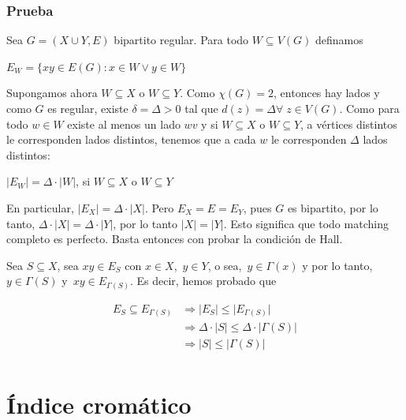 \documentclass[10pt,a4paper]{article}
\begin{document}
\subsubsection*{Prueba}

Sea $G = (X \cup Y, E)$ bipartito regular. Para todo $W \subseteq V(G)$ definamos

\begin{center}
$E_W=\{xy \in E(G): x \in W \lor y \in W\}$
\end{center}

Supongamos ahora $W \subseteq X$ o $W \subseteq Y$. Como $\chi(G) = 2$, entonces hay lados y como $G$ es regular, existe $\delta = \Delta > 0$ tal que $d(z) = \Delta \forall \;z \in V(G)$. Como para todo $w \in W$ existe al menos un lado $wv$ y si $W \subseteq X$ o $W \subseteq Y$, a vértices distintos le corresponden lados distintos, tenemos que a cada $w$ le corresponden $\Delta$ lados distintos:

\begin{center}
$\lvert E_W \rvert = \Delta \cdot \lvert W\rvert$, si $W \subseteq X $ o $W \subseteq Y$
\end{center}

En particular, $\lvert E_X \rvert = \Delta \cdot \lvert X\rvert$. Pero $E_X = E = E_Y$, pues $G$ es bipartito, por lo tanto, $\Delta \cdot \lvert X \rvert = \Delta \cdot \lvert Y \rvert$, por lo tanto $\lvert X \rvert = \lvert Y \rvert$. Esto significa que todo matching completo es perfecto. Basta entonces con probar la condición de Hall.

Sea $S \subseteq X$, sea $xy \in E_S$ con $x \in X$, $y \in Y$, o sea, $y \in \Gamma(x)$ y por lo tanto, $y \in \Gamma(S)$ y $xy \in E_{\Gamma(S)}$. Es decir, hemos probado que

\begin{center}
\begin{align*} E_S \subseteq E_{\Gamma(S)} &\Rightarrow \lvert E_S \rvert \leq\lvert E_{\Gamma(S)} \rvert\\ &\Rightarrow\Delta \cdot \lvert S \rvert \leq \Delta \cdot\lvert \Gamma(S)\rvert\\ & \Rightarrow \lvert S \rvert \leq \lvert \Gamma(S)\rvert\\ \end{align*}
\end{center}

\section*{Índice cromático}
\end{document}
